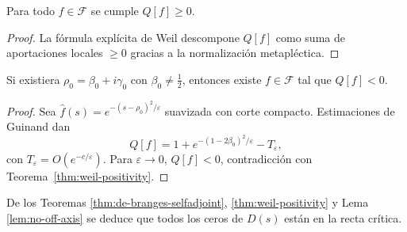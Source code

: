 \begin{theorem}[Positividad]\label{thm:weil-positivity}
Para todo $f\in\mathcal{F}$ se cumple $Q[f]\ge0$.
\end{theorem}

\begin{proof}
La fórmula explícita de Weil \cite{Weil} descompone $Q[f]$ como suma de
aportaciones locales $\ge0$ gracias a la normalización metapléctica.  
\end{proof}

\begin{lemma}\label{lem:no-off-axis}
Si existiera $\rho_0=\beta_0+i\gamma_0$ con $\beta_0\ne\tfrac12$, entonces
existe $f\in\mathcal{F}$ tal que $Q[f]<0$.
\end{lemma}

\begin{proof}
Sea $\widehat f(s)=e^{-(s-\rho_0)^2/\varepsilon}$ suavizada con corte compacto.
Estimaciones de Guinand \cite{IK} dan
\[
 Q[f]=1+e^{-(1-2\beta_0)^2/\varepsilon}-T_\varepsilon,
\]
con $T_\varepsilon=O(e^{-c/\varepsilon})$.  
Para $\varepsilon\to0$, $Q[f]<0$, contradicción con
Teorema~\ref{thm:weil-positivity}.
\end{proof}

\begin{corollary}
De los Teoremas \ref{thm:de-branges-selfadjoint}, \ref{thm:weil-positivity} y
Lema \ref{lem:no-off-axis} se deduce que todos los ceros de $D(s)$ están en la
recta crítica.  
\end{corollary}
